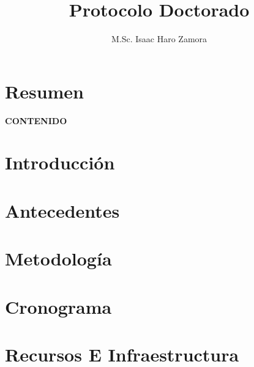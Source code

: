 \documentclass[letterpaper, 12pt]{report} %
\title{Protocolo Doctorado} \author{M.Sc. Isaac Haro Zamora}
\begin{document}
 \maketitle
{} 
\chapter*{Resumen}  
 \clearpage

{\centering\bfseries\MakeUppercase CONTENIDO\par} 
\renewcommand{\contentsname}{} \tableofcontents \clearpage

\onehalfspacing

\chapter{Introducción}  \clearpage
\chapter{Antecedentes}  \clearpage
 \clearpage %
\chapter{Metodología}  \clearpage
\chapter{Cronograma}  \clearpage
\chapter{Recursos E Infraestructura}  \clearpage

\printbibliography
\end{document}
